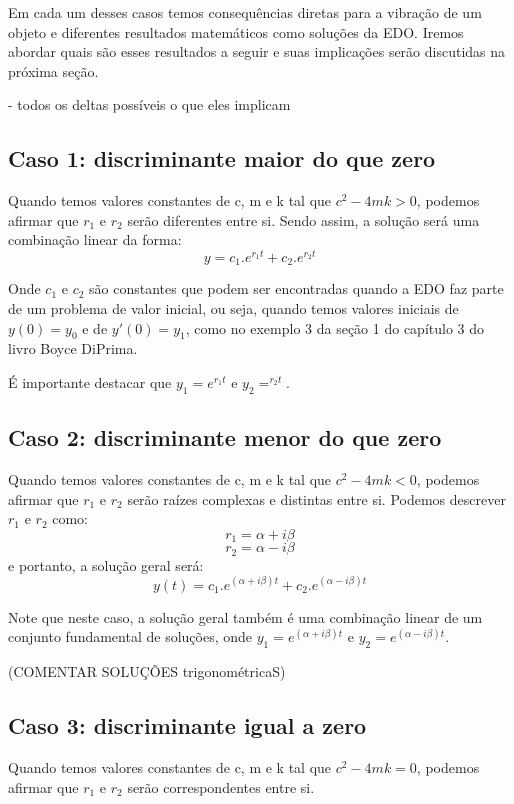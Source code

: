 \documentclass[12pt]{article}
\begin{document}
Em cada um desses casos temos consequências diretas para a vibração de um objeto e
diferentes resultados matemáticos como soluções da EDO. Iremos abordar
quais são esses resultados a seguir e suas implicações serão discutidas na próxima seção.
\pagebreak

- todos os deltas possíveis o que eles implicam

\subsection{Caso 1: discriminante maior do que zero}

Quando temos valores constantes de c, m e k tal que $c^2 - 4mk > 0$, podemos afirmar que 
$r_1$ e $r_2$ serão diferentes entre si. Sendo assim, a solução será uma combinação linear da forma:
\[y = c_1.e^{r_1t} + c_2.e^{r_2t}\]

Onde $c_1$ e $c_2$ são constantes que podem ser encontradas quando a EDO faz parte de um problema
de valor inicial, ou seja, quando temos valores iniciais de $y(0)=y_0$ e de $y'(0)=y_1$, como no 
exemplo 3 da seção 1 do capítulo 3 do livro Boyce DiPrima. 

É importante destacar que  $y_1 = e^{r_1t}$ e $y_2 = ^{r_2t}$.

\subsection{Caso 2: discriminante menor do que zero}

Quando temos valores constantes de c, m e k tal que $c^2 - 4mk < 0$, podemos afirmar que 
$r_1$ e $r_2$ serão raízes complexas e distintas entre si. Podemos descrever $r_1$ e $r_2$ como:
\[ r_1 = \alpha + i\beta\] 
\[ r_2 = \alpha - i\beta\] 
e portanto, a solução geral será:
\[ y(t) = c_1.e^{(\alpha + i\beta)t} + c_2.e^{(\alpha - i\beta)t}\]

Note que neste caso, a solução geral também é uma combinação linear de um conjunto fundamental de soluções,
onde $y_1 = e^{(\alpha + i\beta)t}$ e $y_2 = e^{(\alpha - i\beta)t}$.

(COMENTAR SOLUÇÕES trigonométricaS)

\subsection{Caso 3: discriminante igual a zero}

Quando temos valores constantes de c, m e k tal que $c^2 - 4mk = 0$, podemos afirmar que 
$r_1$ e $r_2$ serão correspondentes entre si. 
\end{document}
